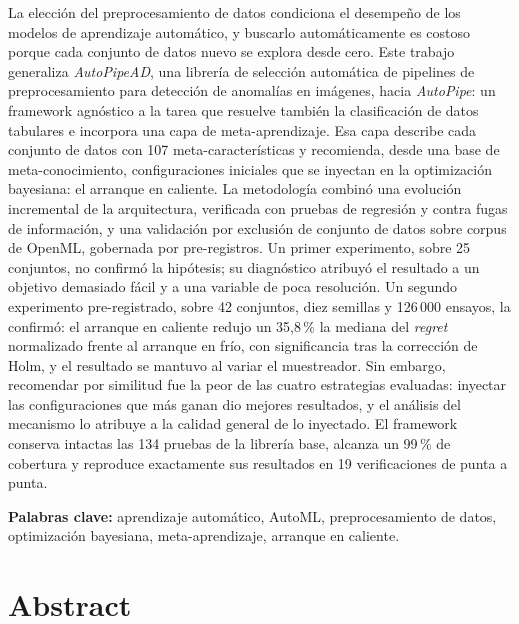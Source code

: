 \documentclass[12pt,letterpaper,oneside]{article}
\begin{document}
La elección del preprocesamiento de datos condiciona el desempeño de los modelos de
aprendizaje automático, y buscarlo automáticamente es costoso porque cada conjunto de
datos nuevo se explora desde cero. Este trabajo generaliza \textit{AutoPipeAD}, una
librería de selección automática de pipelines de preprocesamiento para detección de
anomalías en imágenes, hacia \textit{AutoPipe}: un framework agnóstico a la tarea que
resuelve también la clasificación de datos tabulares e incorpora una capa de
meta-aprendizaje. Esa capa describe cada conjunto de datos con 107 meta-características y
recomienda, desde una base de meta-conocimiento, configuraciones iniciales que se inyectan en
la optimización bayesiana: el arranque en caliente. La metodología combinó una evolución
incremental de la arquitectura, verificada con pruebas de regresión y contra fugas de
información, y una validación por exclusión de conjunto de datos sobre corpus de OpenML,
gobernada por pre-registros. Un primer experimento, sobre 25 conjuntos, no confirmó la
hipótesis; su diagnóstico atribuyó el resultado a un objetivo demasiado fácil y a una variable
de poca resolución. Un segundo
experimento pre-registrado, sobre 42 conjuntos, diez semillas y 126\,000 ensayos, la confirmó:
el arranque en caliente redujo un 35,8\,\% la mediana del \textit{regret} normalizado frente al
arranque en frío, con significancia tras la corrección de Holm, y el resultado se mantuvo al
variar el muestreador. Sin embargo, recomendar por similitud fue la peor de las cuatro
estrategias evaluadas: inyectar las configuraciones que más ganan dio mejores resultados, y el
análisis del mecanismo lo atribuye a la calidad general de lo inyectado. El framework conserva
intactas las 134 pruebas de la librería base, alcanza un 99\,\% de cobertura y reproduce
exactamente sus resultados en 19 verificaciones de punta a punta.

\vspace{1em}
\noindent\textbf{Palabras clave:} aprendizaje automático, AutoML, preprocesamiento de datos,
optimización bayesiana, meta-aprendizaje, arranque en caliente.

\clearpage
\section*{Abstract}
\end{document}
